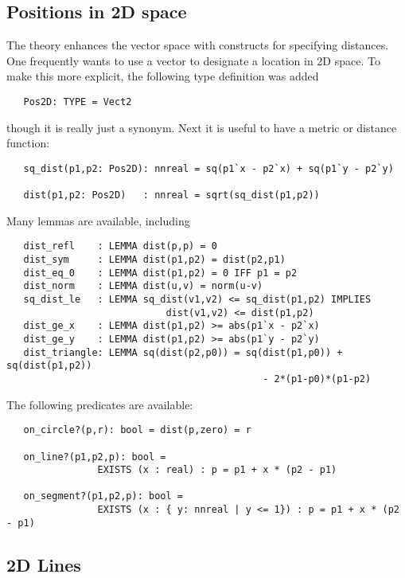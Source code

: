 \documentclass[12pt]{article}
\begin{document}
\subsection{Positions in 2D space}

The theory  enhances the vector space with constructs
for specifying distances.  One frequently wants to use a vector to
designate a location in 2D space.  To make this more explicit, the
following type definition was added
\begin{verbatim}
   Pos2D: TYPE = Vect2
\end{verbatim}
though it is really just a synonym.  Next it is useful to have
a metric or distance function:
\begin{verbatim}
   sq_dist(p1,p2: Pos2D): nnreal = sq(p1`x - p2`x) + sq(p1`y - p2`y)

   dist(p1,p2: Pos2D)   : nnreal = sqrt(sq_dist(p1,p2))
\end{verbatim}
Many lemmas are available, including
\begin{verbatim}
   dist_refl    : LEMMA dist(p,p) = 0
   dist_sym     : LEMMA dist(p1,p2) = dist(p2,p1)
   dist_eq_0    : LEMMA dist(p1,p2) = 0 IFF p1 = p2 
   dist_norm    : LEMMA dist(u,v) = norm(u-v)
   sq_dist_le   : LEMMA sq_dist(v1,v2) <= sq_dist(p1,p2) IMPLIES
                            dist(v1,v2) <= dist(p1,p2)     
   dist_ge_x    : LEMMA dist(p1,p2) >= abs(p1`x - p2`x)  
   dist_ge_y    : LEMMA dist(p1,p2) >= abs(p1`y - p2`y) 
   dist_triangle: LEMMA sq(dist(p2,p0)) = sq(dist(p1,p0)) + sq(dist(p1,p2)) 
                                             - 2*(p1-p0)*(p1-p2) 
\end{verbatim}
The following predicates are available:
\begin{verbatim}
   on_circle?(p,r): bool = dist(p,zero) = r   

   on_line?(p1,p2,p): bool = 
                EXISTS (x : real) : p = p1 + x * (p2 - p1) 

   on_segment?(p1,p2,p): bool = 
                EXISTS (x : { y: nnreal | y <= 1}) : p = p1 + x * (p2 - p1) 
\end{verbatim}

\subsection{2D Lines}
\end{document}
